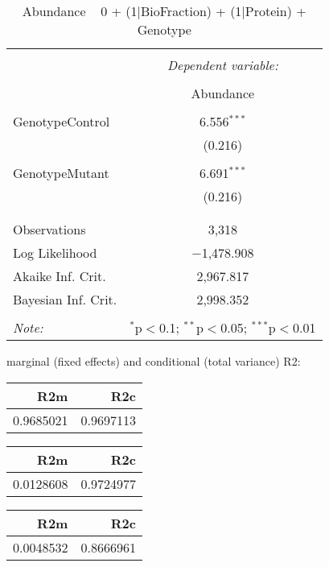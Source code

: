 \documentclass[11pt]{report}
\begin{document}
\begin{table}[!htbp] \centering 
  \caption{Abundance ~ 0 + (1|BioFraction) + (1|Protein) + Genotype} 
  \label{} 
\begin{tabular}{@{\extracolsep{5pt}}lc} 
\\[-1.8ex]\hline 
\hline \\[-1.8ex] 
 & \multicolumn{1}{c}{\textit{Dependent variable:}} \\ 
\cline{2-2} 
\\[-1.8ex] & Abundance \\ 
\hline \\[-1.8ex] 
 GenotypeControl & 6.556$^{***}$ \\ 
  & (0.216) \\ 
  & \\ 
 GenotypeMutant & 6.691$^{***}$ \\ 
  & (0.216) \\ 
  & \\ 
\hline \\[-1.8ex] 
Observations & 3,318 \\ 
Log Likelihood & $-$1,478.908 \\ 
Akaike Inf. Crit. & 2,967.817 \\ 
Bayesian Inf. Crit. & 2,998.352 \\ 
\hline 
\hline \\[-1.8ex] 
\textit{Note:}  & \multicolumn{1}{r}{$^{*}$p$<$0.1; $^{**}$p$<$0.05; $^{***}$p$<$0.01} \\ 
\end{tabular} 
\end{table} 
marginal (fixed effects) and conditional (total variance) R2:

\begin{tabular}{r|r}
\hline
R2m & R2c\\
\hline
0.9685021 & 0.9697113\\
\hline
\end{tabular}

\begin{tabular}{r|r}
\hline
R2m & R2c\\
\hline
0.0128608 & 0.9724977\\
\hline
\end{tabular}

\begin{tabular}{r|r}
\hline
R2m & R2c\\
\hline
0.0048532 & 0.8666961\\
\hline
\end{tabular}
\end{document}
